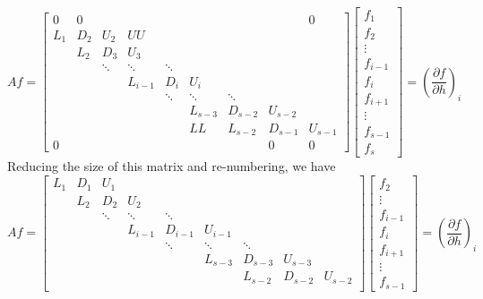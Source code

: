 \documentclass[landscape]{article}
\begin{document}
\[ Af = \left[
\begin{array}{ccccccccc}
0 & 0 &  &   &   &   &   &   & 0 \\
L_{1} & D_{2} & U_{2} & UU  &   &   &   &   &   \\
  & L_{2} & D_{3} & U_{3} &   &   &   &   &   \\
  &   & \ddots & \ddots & \ddots &   &   &   &   \\
  &   &   & L_{i-1} & D_{i} & U_{i} &   &   &   \\
  &   &   &   & \ddots & \ddots & \ddots &   &   \\
  &   &   &   &   & L_{s-3} & D_{s-2} & U_{s-2} &   \\
  &   &   &   &   & LL & L_{s-2} & D_{s-1} & U_{s-1} \\
0 &   &   &   &   &   &  & 0 & 0
\end{array} \right] \left[ \begin{array}{c}
f_{1} \\ f_{2} \\ \vdots \\ f_{i-1} \\ f_{i} \\ f_{i+1} \\ \vdots \\ f_{s-1} \\ f_{s}
\end{array} \right] 
= \left( \frac{\partial f}{\partial h} \right)_{i} 
\]
Reducing the size of this matrix and re-numbering, we have
\[ Af = \left[
\begin{array}{ccccccccc}
L_{1} & D_{1} & U_{1} &  &   &   &   &   &   \\
  & L_{2} & D_{2} & U_{2} &   &   &   &   &   \\
  &   & \ddots & \ddots & \ddots &   &   &   &   \\
  &   &   & L_{i-1} & D_{i-1} & U_{i-1} &   &   &   \\
  &   &   &   & \ddots & \ddots & \ddots &   &   \\
  &   &   &   &   & L_{s-3} & D_{s-3} & U_{s-3} &   \\
  &   &   &   &   & & L_{s-2} & D_{s-2} & U_{s-2} \\
\end{array} \right] \left[ \begin{array}{c}
f_{2} \\ \vdots \\ f_{i-1} \\ f_{i} \\ f_{i+1} \\ \vdots \\ f_{s-1}
\end{array} \right] 
= \left( \frac{\partial f}{\partial h} \right)_{i} 
\]
\end{document}
